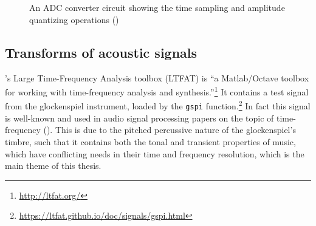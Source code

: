 \documentclass[report.tex]{subfiles}
\begin{document}
\begin{figure}[ht]
	\centering
	\hspace{0.1em}
	\\
	\\
	\caption{An ADC converter circuit showing the time sampling and amplitude quantizing operations (\cite[Chapter~4]{discretebook})}
	\label{fig:adccircuit}
\end{figure}

\vfill
\clearpage

\subsection{Transforms of acoustic signals}

\textcite{ltfat}'s Large Time-Frequency Analysis toolbox (LTFAT) is ``a Matlab/Octave toolbox for working with time-frequency analysis and synthesis.''\footnote{\url{http://ltfat.org/}} It contains a test signal from the glockenspiel instrument, loaded by the \Verb#gspi# function.\footnote{\url{https://ltfat.github.io/doc/signals/gspi.html}} In fact this signal is well-known and used in audio signal processing papers on the topic of time-frequency (\cite{doerflerphd, balazs, jaillet, tfjigsaw, invertiblecqt}). This is due to the pitched percussive nature of the glockenspiel's timbre, such that it contains both the tonal and transient properties of music, which have conflicting needs in their time and frequency resolution, which is the main theme of this thesis.
\end{document}
